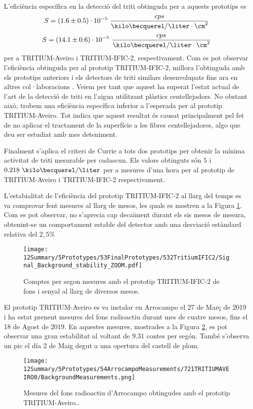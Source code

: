 L'eficiència específica en la detecció del triti obtinguda per a aquests prototips es
$$S = (1.6 \pm 0.5)\cdot{} 10^{-5}~\frac{cps}{\kilo\becquerel/\liter \cdot{} \cm^{2}}$$
$$S = (14.1 \pm 0.6)\cdot{} 10^{-5}~\frac{cps}{\kilo\becquerel/\liter \cdot{} \cm^{2}}$$
per a TRITIUM-Aveiro i TRITIUM-IFIC-2, respectivament. Com es pot observar l'eficiència obtinguda per al prototip TRITIUM-IFIC-2, millora l'obtinguda amb els prototips anteriors i els detectors de triti similars desenvolupats fins ara en altres col·laboracions \cite{Hofstetter1, Hofstetter2}. Veiem per tant que aquest ha superat l'estat actual de l'art de la detecció de triti en l'aigua utilitzant plàstics centellejadors. No obstant això, trobem una eficiència específica inferior a l'esperada per al prototip TRITIUM-Aveiro. Tot indica que aquest resultat és causat principalment pel fet de no aplicar el tractament de la superfície a les fibres centellejadores, algo que deu ser estudiat amb mes deteniment.

Finalment s'aplica el criteri de Currie \cite{Knoll} a tots dos prototips per obtenir la mínima activitat de triti mesurable per cadascun. Els valors obtinguts són $5$ i $0.218~\kilo\becquerel/\liter$ per a mesures d'una hora per al prototip de TRITIUM-Aveiro i TRITIUM-IFIC-2 respectivament. 

L'estabialitat de l'eficiència del prototip TRITIUM-IFIC-2 al llarg del temps es va comprovar fent mesures al llarg de mesos, les quals es mostren a la Figura \ref{fig:MonitoritzacioTRITIUMIFIC2}. Com es pot observar, no s'aprecia cap decaïment durant els sis mesos de mesura, obtenint-se un comportament estable del detector amb una desviació estàndard relativa del $2,5\%$

\begin{figure}[h]
\centering
\texttt{[image: 12Summary/5Prototypes/53FinalPrototypes/532TritiumIFIC2/Signal\_Background\_stability\_ZOOM.pdf]}
\caption{Comptes per segon mesures amb el prototip TRITIUM-IFIC-2 de fons i senyal al llarg de diversos mesos.\label{fig:MonitoritzacioTRITIUMIFIC2}}
\end{figure}

El prototip TRITIUM-Aveiro es va instalar en Arrocampo el 27 de Març de 2019 i ha estat prenent mesures del fons radioactiu durant mes de cuatre mesos, fins el 18 de Agost de 2019. En aquestes mesures, mostrades a la Figura \ref{fig:FonsArrocampoAveiro}, es pot observar una gran estabilitat al voltant de $9.31$ contes per segón. També s'observa un pic el día 2 de Maig degut a una opertura del castell de plom.

\begin{figure}[h]
\centering
\texttt{[image: 12Summary/5Prototypes/54ArrocampoMeasurements/721TRITIUMAVEIRO0/BackgroundMeasurements.png]}
\caption{Mesures del fons radioactiu d'Arrocampo obtingudes amb el prototip TRITIUM-Aveiro.\cite{ExperimentalPaperCarlos}.\label{fig:FonsArrocampoAveiro}}
\end{figure}